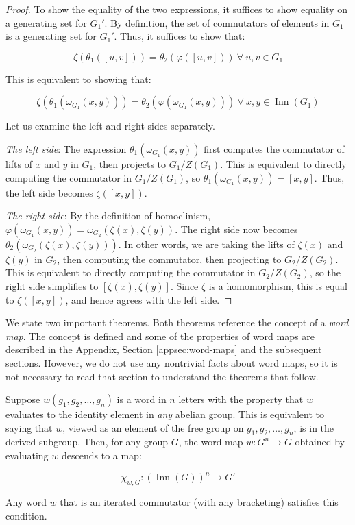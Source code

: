 \begin{proof}
  To show the equality of the two expressions, it suffices to show
  equality on a generating set for $G_1'$. By definition, the set of
  commutators of elements in $G_1$ is a generating set for
  $G_1'$. Thus, it suffices to show that:

  $$\zeta(\theta_1([u,v])) = \theta_2(\varphi([u,v])) \ \forall \ u,v \in G_1$$

  This is equivalent to showing that:

  $$\zeta(\theta_1(\omega_{G_1}(x,y))) = \theta_2(\varphi(\omega_{G_1}(x,y))) \ \forall \ x,y \in \operatorname{Inn}(G_1)$$

  Let us examine the left and right sides separately. 

  {\em The left side}: The expression $\theta_1(\omega_{G_1}(x,y))$
  first computes the commutator of lifts of $x$ and $y$ in $G_1$, then
  projects to $G_1/Z(G_1)$. This is equivalent to directly computing
  the commutator in $G_1/Z(G_1)$, so $\theta_1(\omega_{G_1}(x,y)) =
  [x,y]$. Thus, the left side becomes $\zeta([x,y])$.

  {\em The right side}: By the definition of homoclinism,
  $\varphi(\omega_{G_1}(x,y)) = \omega_{G_2}(\zeta(x),\zeta(y))$. The
  right side now becomes
  $\theta_2(\omega_{G_2}(\zeta(x),\zeta(y)))$. In other words, we are
  taking the lifts of $\zeta(x)$ and $\zeta(y)$ in $G_2$, then
  computing the commutator, then projecting to $G_2/Z(G_2)$. This is
  equivalent to directly computing the commutator in $G_2/Z(G_2)$, so
  the right side simplifies to $[\zeta(x),\zeta(y)]$. Since $\zeta$ is
  a homomorphism, this is equal to $\zeta([x,y])$, and hence agrees
  with the left side.
\end{proof}

We state two important theorems. Both theorems reference the concept
of a {\em word map}. The concept is defined and some of the properties
of word maps are described in the Appendix, Section
\ref{appsec:word-maps} and the subsequent sections. However, we do not
use any nontrivial facts about word maps, so it is not necessary to
read that section to understand the theorems that follow.

\begin{theorem}\label{thm:iterated-commutator-descends-to-inn}
  Suppose $w(g_1,g_2,\dots,g_n)$ is a word in $n$ letters with the
  property that $w$ evaluates to the identity element in {\em any}
  abelian group. This is equivalent to saying that $w$, viewed as an
  element of the free group on $g_1,g_2,\dots,g_n$, is in the derived
  subgroup. Then, for any group $G$, the word map $w:G^n \to G$ obtained
  by evaluating $w$ descends to a map:

  $$\chi_{w,G}: (\operatorname{Inn}(G))^n  \to G'$$

  Any word $w$ that is an iterated commutator (with any bracketing)
  satisfies this condition.
\end{theorem}

